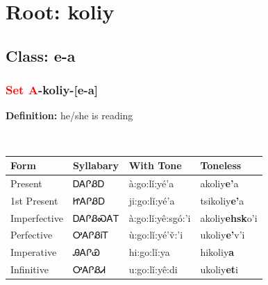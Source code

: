\needspace{4in}
\section*{Root: koliy}
\nopagebreak
{}
\needspace{3in}
\subsection*{Class: e-a}
\nopagebreak
\needspace{2in}
\subsubsection*{\textcolor{Red}{Set A}{-}\textbf{koliy}{-}[e-a]}
\nopagebreak
\textbf{Definition: } he/she is reading
\\[0.5em]
\begin{tabularx}{\textwidth}{l X X X}%
\toprule%
\textbf{Form}&\textbf{Syllabary}&\textbf{With Tone}&\textbf{Toneless}\\%
\midrule%
Present&ᎠᎪᎵᏰᎠ&à:go:lǐ:yé’a&akoliy\textbf{e'}a\\%
1st Present&ᏥᎪᎵᏰᎠ&ji:go:lǐ:yé’a&tsikoliy\textbf{e'}a\\%
Imperfective&ᎠᎪᎵᏰᏍᎪᎢ&à:go:lǐ:yê:sgó:’i&akoliy\textbf{ehsk}o'i\\%
Perfective&ᎤᎪᎵᏰᎥᎢ&ù:go:lǐ:yé’v̌:’i&ukoliy\textbf{e'}v'i\\%
Imperative&ᎯᎪᎵᏯ&hi:go:lǐ:ya&hikoliy\textbf{a}\\%
Infinitive&ᎤᎪᎵᏰᏗ&u:go:lǐ:yê:di&ukoliy\textbf{et}i\\%
\bottomrule%
\end{tabularx}
\\[1em]